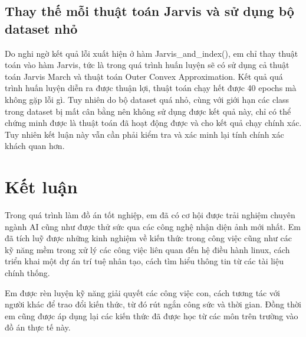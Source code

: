 \documentclass[12pt,a4paper,openany,oneside]{report}
\begin{document}
\section{Thay thế mỗi thuật toán Jarvis và sử dụng bộ dataset nhỏ}
Do nghi ngờ kết quả lỗi xuất hiện ở hàm Jarvis\_and\_index(), em chỉ thay thuật toán vào hàm Jarvis, tức là trong quá trình huấn luyện sẽ có sử dụng cả thuật toán Jarvis March và thuật toán Outer Convex Approximation. Kết quả quá trình huấn luyện diễn ra được thuận lợi, thuật toán chạy hết được 40 epochs mà không gặp lỗi gì. Tuy nhiên do bộ dataset quá nhỏ, cùng với giới hạn các class trong dataset bị mất cân bằng nên không sử dụng được kết quả này, chỉ có thể chứng minh được là thuật toán đã hoạt động được và cho kết quả chạy chính xác. Tuy nhiên kết luận này vẫn cần phải kiểm tra và xác minh lại tính chính xác khách quan hơn. 
\chapter*{{Kết luận}}

Trong quá trình làm đồ án tốt nghiệp, em đã có cơ hội được trải nghiệm chuyên ngành AI cũng như được thử sức qua các công nghệ nhận diện ảnh mới nhất. Em đã tích luỹ được những kinh nghiệm về kiến thức trong công việc cũng như các kỹ năng mềm trong xử lý các công việc liên quan đến hệ điều hành linux, cách triển khai một dự án trí tuệ nhân tạo, cách tìm hiểu thông tin từ các tài liệu chính thống.
 
Em được rèn luyện kỹ năng giải quyết các công việc con, cách tương tác với người khác để trao đổi kiến thức, từ đó rút ngắn công sức và thời gian. Đồng thời em cũng được áp dụng lại các kiến thức đã được học từ các môn trên trường vào đồ án thực tế này.
\end{document}
